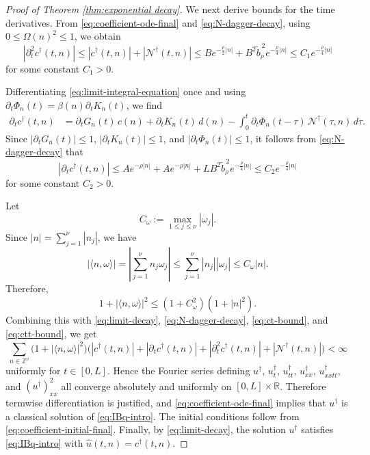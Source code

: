 \documentclass[10pt,a4paper]{amsart}
\begin{document}
\begin{proof}[Proof of Theorem \ref{thm:exponential decay}]
We next derive bounds for the time derivatives. From
\eqref{eq:coefficient-ode-final} and \eqref{eq:N-dagger-decay}, using
$0\leq \Omega(n)^2\leq 1$, we obtain
\begin{equation}\label{eq:ctt-bound}
|\partial_t^2 c^{\dagger}(t,n)|
\leq
|c^{\dagger}(t,n)|+|\mathcal{N}^{\dagger}(t,n)|
\leq
B e^{-\frac{\rho}{2}|n|}
+
B^2 \widetilde b_{\rho}^{\,2} e^{-\frac{\rho}{4}|n|}
\leq
C_1 e^{-\frac{\rho}{4}|n|}
\end{equation}
for some constant $C_1>0$.

Differentiating \eqref{eq:limit-integral-equation} once and using
$\partial_t \Phi_n(t)=\beta(n)\partial_t K_n(t)$, we find
\begin{align*}
\partial_t c^{\dagger}(t,n)
&=
\partial_t G_n(t)\,c(n)
+
\partial_t K_n(t)\,d(n)
-
\int_0^t \partial_t \Phi_n(t-\tau)\,\mathcal{N}^{\dagger}(\tau,n)\,d\tau .
\end{align*}
Since $|\partial_t G_n(t)|\leq 1$, $|\partial_t K_n(t)|\leq 1$, and
$|\partial_t \Phi_n(t)|\leq 1$, it follows from
\eqref{eq:N-dagger-decay} that
\begin{equation}\label{eq:ct-bound}
|\partial_t c^{\dagger}(t,n)|
\leq
A e^{-\rho|n|}
+
A e^{-\rho|n|}
+
L B^2 \widetilde b_{\rho}^{\,2} e^{-\frac{\rho}{4}|n|}
\leq
C_2 e^{-\frac{\rho}{4}|n|}
\end{equation}
for some constant $C_2>0$.

Let
\[
C_{\omega}:=\max_{1\leq j\leq \nu} |\omega_j|.
\]
Since $|n|=\sum_{j=1}^{\nu}|n_j|$, we have
\begin{equation*}
|\langle n,\omega\rangle|
=
\left|\sum_{j=1}^{\nu} n_j\omega_j\right|
\leq
\sum_{j=1}^{\nu} |n_j||\omega_j|
\leq
C_{\omega}|n|.
\end{equation*}
Therefore,
\[
1+|\langle n,\omega\rangle|^2 \leq (1+C_{\omega}^2)(1+|n|^2).
\]
Combining this with \eqref{eq:limit-decay}, \eqref{eq:N-dagger-decay},
\eqref{eq:ct-bound}, and \eqref{eq:ctt-bound}, we get
\[
\sum_{n\in \mathbb{Z}^{\nu}}
\big(1+|\langle n,\omega\rangle|^2\big)
\Big(
|c^{\dagger}(t,n)|+|\partial_t c^{\dagger}(t,n)|
+|\partial_t^2 c^{\dagger}(t,n)|+|\mathcal{N}^{\dagger}(t,n)|
\Big)
<\infty
\]
uniformly for $t\in [0,L]$. Hence the Fourier series defining
$u^{\dagger}$, $u_t^{\dagger}$, $u_{tt}^{\dagger}$, $u_{xx}^{\dagger}$,
$u_{xxtt}^{\dagger}$, and $(u^{\dagger})^2_{xx}$ all converge absolutely and uniformly
on $[0,L]\times \mathbb{R}$. Therefore termwise differentiation is justified, and
\eqref{eq:coefficient-ode-final} implies that $u^{\dagger}$ is a classical solution of
\eqref{eq:IBq-intro}. The initial conditions follow from \eqref{eq:coefficient-initial-final}.
Finally, by \eqref{eq:limit-decay}, the solution $u^{\dagger}$ satisfies
\eqref{eq:IBq-intro} with $\widehat u(t,n)=c^{\dagger}(t,n)$.


\end{proof}
\end{document}
